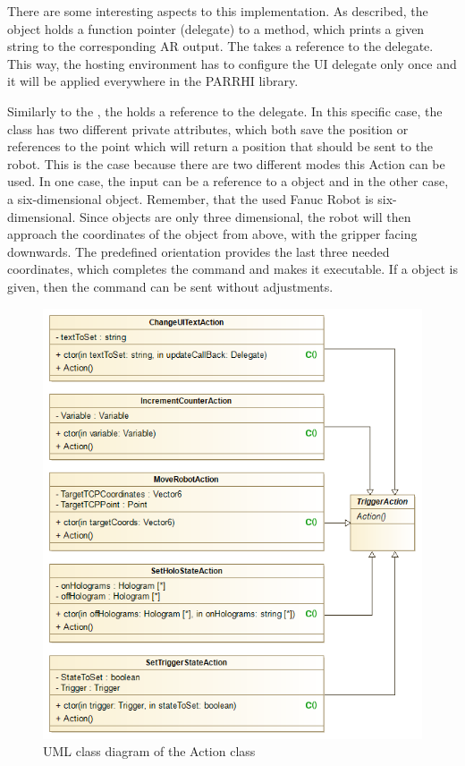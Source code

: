 There are some interesting aspects to this implementation. As described, the  object holds a function pointer (delegate) to a method, which prints a given string to the corresponding AR output. The  takes a reference to the  delegate. This way, the hosting environment has to configure the UI delegate only once and it will be applied everywhere in the PARRHI library.

Similarly to the , the  holds a reference to the  delegate. In this specific case, the class has two different private attributes, which both save the position or references to the point which will return a position that should be sent to the robot. This is the case because there are two different modes this Action can be used. In one case, the input can be a reference to a  object and in the other case, a six-dimensional  object. Remember, that the used Fanuc Robot is six-dimensional. Since  objects are only three dimensional, the robot will then approach the coordinates of the  object from above, with the gripper facing downwards. The predefined orientation provides the last three needed coordinates, which completes the command and makes it executable. If a  object is given, then the command can be sent without adjustments.

\begin{figure}[!th]
	\centering
	\includegraphics[width=0.7\linewidth]{Figures/Implementation_Action}
	\caption{UML class diagram of the Action class}
	\label{Fig:ImplementationAction}
\end{figure}


